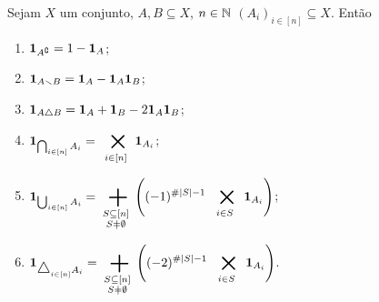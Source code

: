 \begin{exercise}
Sejam $X$ um conjunto, $A,B \subseteq X$, $n \in \mathbb{N}$ $(A_i)_{i \in [n]} \subseteq X$. Então
	\begin{enumerate}
	\item ${\bm 1}_{A^\complement} = 1- {\bm 1}_A$;
	\item ${\bm 1}_{A \smallsetminus B} = {\bm 1}_A-{\bm 1}_A{\bm 1}_B$;
	\item ${\bm 1}_{A \mathbin{\triangle} B} = {\bm 1}_A+{\bm 1}_B-2{\bm 1}_A{\bm 1}_B$;
	\item $\displaystyle\idc_{\bigcap_{i \in [n]} A_i} = \bigtimes_{i \in [n]} \idc_{A_i}$;
	\item $\displaystyle\idc_{\bigcup_{i \in [n]} A_i} = \sum_{\substack{S \subseteq [n]\\S \neq \emptyset}} \left((-1)^{\card{S}-1} \bigtimes_{i \in S}\idc_{A_i}\right)$;
	\item $\displaystyle\idc_{\scalebox{1.2}{$\difsim$}_{i \in [n]} A_i} = \sum_{\substack{S \subseteq [n]\\S \neq \emptyset}} \left((-2)^{\card{S}-1} \bigtimes_{i \in S}\idc_{A_i} \right)$.
	\end{enumerate}
\end{exercise}
%	















